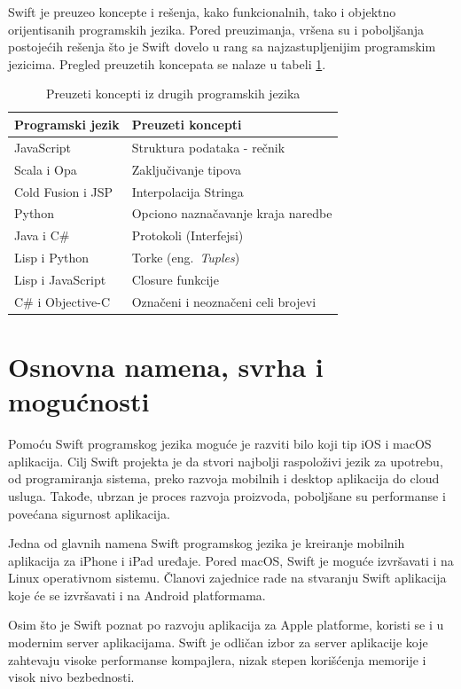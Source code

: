 \documentclass[a4paper]{article}
\begin{document}
Swift je preuzeo koncepte i rešenja, kako funkcionalnih, tako i objektno orijentisanih programskih jezika. Pored preuzimanja, vršena su i poboljšanja postojećih rešenja što je Swift dovelo u rang sa najzastupljenijim programskim jezicima. Pregled preuzetih koncepata se nalaze u tabeli \ref{tab:koncepti}.

\begin{table}[h!]
\begin{center}
\caption{Preuzeti koncepti iz drugih programskih jezika}
\begin{tabular}{|l|l|} \hline
\label{tab:koncepti}
\textbf{Programski jezik} & \textbf{Preuzeti koncepti} \\ \hline
JavaScript & Struktura podataka - rečnik  \\ \hline
Scala i Opa & Zaključivanje tipova \\ \hline
Cold Fusion i JSP & Interpolacija Stringa \\ \hline
Python & Opciono naznačavanje kraja naredbe \\ \hline
Java i C\# & Protokoli (Interfejsi) \\ \hline
Lisp i Python & Torke (eng.~{\em Tuples}) \\ \hline
Lisp i JavaScript &  Closure funkcije \\ \hline
C\# i Objective-C & Označeni i neoznačeni celi brojevi \\ \hline
\end{tabular}
\end{center}
\end{table}

\section{Osnovna namena, svrha i mogućnosti}	
\label{sec:treciDeo}
Pomoću Swift programskog jezika moguće je razviti bilo koji tip iOS i macOS aplikacija. Cilj Swift projekta je da stvori najbolji raspoloživi jezik za upotrebu, od programiranja sistema, preko razvoja mobilnih i desktop aplikacija do cloud usluga. Takođe, ubrzan je proces razvoja proizvoda, poboljšane su performanse i povećana sigurnost aplikacija.

Jedna od glavnih namena Swift programskog jezika je kreiranje mobilnih aplikacija za iPhone i iPad uređaje. Pored macOS, Swift je moguće izvršavati i na Linux operativnom sistemu. Članovi zajednice rade na stvaranju Swift aplikacija koje će se izvršavati i na Android platformama.

Osim što je Swift poznat po razvoju aplikacija za Apple platforme, koristi se i u modernim server aplikacijama. Swift je odličan izbor za server aplikacije koje zahtevaju visoke performanse kompajlera, nizak stepen korišćenja memorije i visok nivo bezbednosti.
\end{document}
